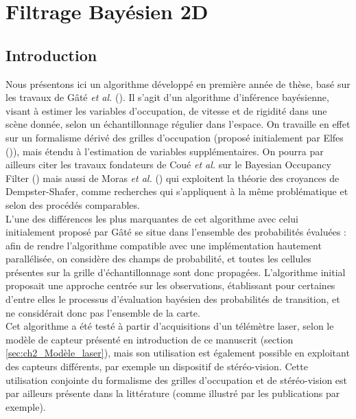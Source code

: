 \section{Filtrage Bayésien 2D} \label{sec:ch5_Bayésien_2D}
\subsection{Introduction}
Nous présentons ici un algorithme développé en première année de thèse, basé sur les travaux de Gâté \textit{et al.} (\cite{Gate2009}). Il s'agit d'un algorithme d'inférence bayésienne, visant à estimer les variables d'occupation, de vitesse et de rigidité dans une scène donnée, selon un échantillonnage régulier dans l'espace. On travaille en effet sur un formalisme dérivé des grilles d'occupation (proposé initialement par Elfes (\cite{Elfes1987})), mais étendu à l'estimation de variables supplémentaires. On pourra par ailleurs citer les travaux fondateurs de Coué \textit{et al.} sur le \og Bayesian Occupancy Filter\fg{} (\cite{Coue2006}) mais aussi de Moras \textit{et al.} (\cite{Moras2011a}) qui exploitent la théorie des croyances de Dempster-Shafer, comme recherches qui s'appliquent à la même problématique et selon des procédés comparables.\\

L'une des différences les plus marquantes de cet algorithme avec celui initialement proposé par Gâté se situe dans l'ensemble des probabilités évaluées : afin de rendre l'algorithme compatible avec une implémentation hautement parallélisée, on considère des champs de probabilité, et toutes les cellules présentes sur la grille d'échantillonnage sont donc propagées. L'algorithme initial proposait une approche centrée sur les observations, établissant pour certaines d'entre elles le processus d'évaluation bayésien des probabilités de transition, et ne considérait donc pas l'ensemble de la carte.\\

Cet algorithme a été testé à partir d'acquisitions d'un télémètre laser, selon le modèle de capteur présenté en introduction de ce manuscrit (section \ref{sec:ch2_Modèle_laser}), mais son utilisation est également possible en exploitant des capteurs différents, par exemple un dispositif de stéréo-vision. Cette utilisation conjointe du formalisme des grilles d'occupation et de stéréo-vision est par ailleurs présente dans la littérature (comme illustré par les publications \cite{Moravec1996, Badino2007, Nguyen2012} par exemple). \\

